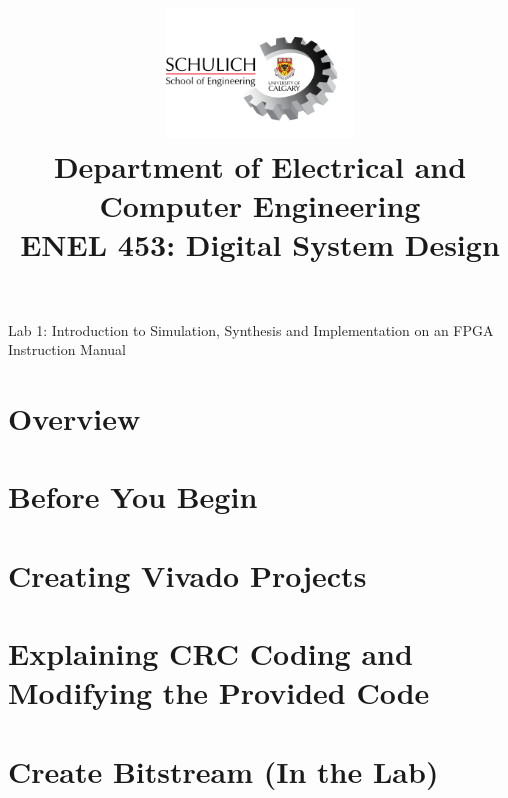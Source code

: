 \documentclass{article}
\title{
  \includegraphics[width=5cm]{Images/Logo.png}\\
  \normalsize Department of Electrical and Computer Engineering\\
  ENEL 453: Digital System Design
}
\date{\semester}
\makeatletter
\renewcommand{\maketitle}{%
  \begin{center}
    {\@title}
    \vspace{1cm} %
    {\@date}
  \end{center}
}
\makeatother
\begin{document}
\centering

\maketitle
\large Lab 1: Introduction to Simulation, Synthesis and Implementation on an FPGA \\
\large Instruction Manual

\RaggedRight
\section{Overview}



\section{Before You Begin}


\section{Creating Vivado Projects}


\section{Explaining CRC Coding and Modifying the Provided Code}



\section{Create Bitstream (In the Lab)}


\end{document}
